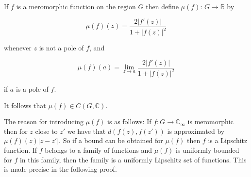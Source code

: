 If $f$ is a meromorphic function on the region $G$ then define $\mu(f)$: $G \to \mathbb{R}$ by

$$\mu(f)(z) = \frac{2|f'(z)|}{1 + |f(z)|^2}$$

whenever $z$ is not a pole of $f$, and

$$\mu(f)(a) = \lim_{z \to a} \frac{2|f'(z)|}{1 + |f(z)|^2}$$

if $a$ is a pole of $f$.

It follows that $\mu(f) \in C(G, \mathbb{C})$.

The reason for introducing $\mu(f)$ is as follows: If $f: G \to \mathbb{C}_\infty$ is meromorphic then for $z$ close to $z'$ we have that $d(f(z), f(z'))$ is approximated by $\mu(f)(z) |z - z'|$. So if a bound can be obtained for $\mu(f)$ then $f$ is a Lipschitz function. If $f$ belongs to a family of functions and $\mu(f)$ is uniformly bounded for $f$ in this family, then the family is a uniformly Lipschitz set of functions. This is made precise in the following proof.